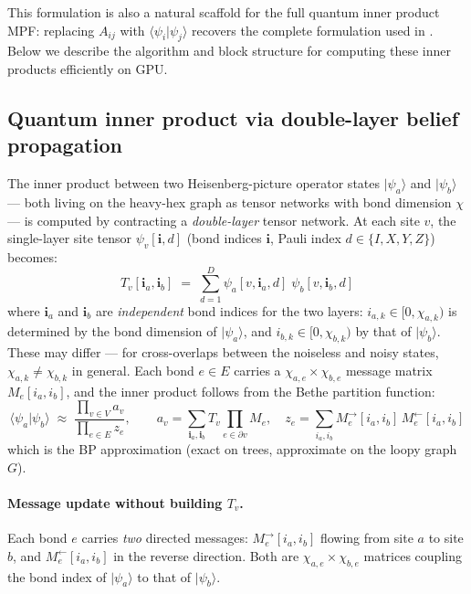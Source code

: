 \documentclass[12pt]{article}
\begin{document}
This formulation is also a natural scaffold for the full quantum inner product
MPF: replacing $A_{ij}$ with $\langle\psi_i|\psi_j\rangle$ recovers the
complete formulation used in \cite{mpf-ref}.
Below we describe the algorithm and block structure for computing these
inner products efficiently on GPU.

\subsection*{Quantum inner product via double-layer belief propagation}

The inner product between two Heisenberg-picture operator states
$|\psi_a\rangle$ and $|\psi_b\rangle$ — both living on the heavy-hex graph
as tensor networks with bond dimension $\chi$ — is computed by contracting
a \emph{double-layer} tensor network.
At each site $v$, the single-layer site tensor $\psi_v[\mathbf{i}, d]$
(bond indices $\mathbf{i}$, Pauli index $d\in\{I,X,Y,Z\}$) becomes:
\begin{equation}
    T_v[\mathbf{i}_a, \mathbf{i}_b]
    \;=\; \sum_{d=1}^{D} \psi_a[v, \mathbf{i}_a, d]\;\psi_b[v, \mathbf{i}_b, d]
    \label{eq:Tv}
\end{equation}
where $\mathbf{i}_a$ and $\mathbf{i}_b$ are \emph{independent} bond indices
for the two layers: $i_{a,k} \in [0, \chi_{a,k})$ is determined by the bond
dimension of $|\psi_a\rangle$, and $i_{b,k} \in [0, \chi_{b,k})$ by that of
$|\psi_b\rangle$. These may differ — for cross-overlaps between the noiseless
and noisy states, $\chi_{a,k} \neq \chi_{b,k}$ in general.
Each bond $e\in E$ carries a $\chi_{a,e}\times\chi_{b,e}$ message matrix
$M_e[i_a,i_b]$, and the inner product follows from the Bethe partition function:
\begin{equation}
    \langle\psi_a|\psi_b\rangle
    \;\approx\;
    \frac{\prod_{v\in V} a_v}{\prod_{e\in E} z_e},
    \label{eq:bethe_formula}
    \qquad
    a_v = \sum_{\mathbf{i}_a,\mathbf{i}_b} T_v\!\prod_{e\in\partial v} M_e,
    \quad
    z_e = \sum_{i_a,i_b} M_e^{\to}[i_a,i_b]\,M_e^{\leftarrow}[i_a,i_b]
\end{equation}
which is the BP approximation (exact on trees, approximate on the loopy graph $G$).

\paragraph{Message update without building $T_v$.}
Each bond $e$ carries \emph{two} directed messages: $M_e^{\to}[i_a,i_b]$
flowing from site $a$ to site $b$, and $M_e^{\leftarrow}[i_a,i_b]$ in the
reverse direction.
Both are $\chi_{a,e}\times\chi_{b,e}$ matrices coupling the bond index
of $|\psi_a\rangle$ to that of $|\psi_b\rangle$.
\end{document}
